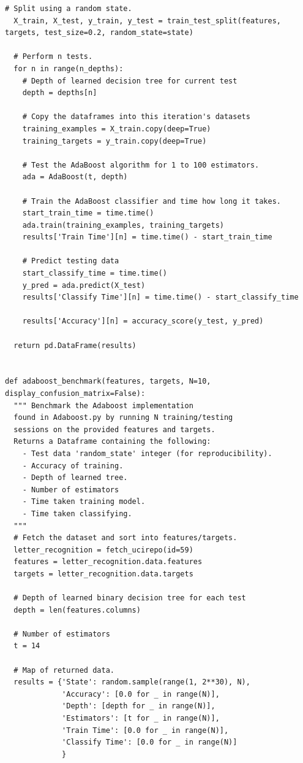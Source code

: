 \documentclass[a4paper]{article}
\begin{document}
\begin{lstlisting}[basicstyle= \scriptsize]
  # Split using a random state.
  X_train, X_test, y_train, y_test = train_test_split(features, targets, test_size=0.2, random_state=state)

  # Perform n tests.
  for n in range(n_depths):
    # Depth of learned decision tree for current test
    depth = depths[n]

    # Copy the dataframes into this iteration's datasets
    training_examples = X_train.copy(deep=True)
    training_targets = y_train.copy(deep=True)

    # Test the AdaBoost algorithm for 1 to 100 estimators.
    ada = AdaBoost(t, depth) 

    # Train the AdaBoost classifier and time how long it takes.
    start_train_time = time.time()
    ada.train(training_examples, training_targets)
    results['Train Time'][n] = time.time() - start_train_time 

    # Predict testing data
    start_classify_time = time.time()
    y_pred = ada.predict(X_test)
    results['Classify Time'][n] = time.time() - start_classify_time

    results['Accuracy'][n] = accuracy_score(y_test, y_pred)

  return pd.DataFrame(results)


def adaboost_benchmark(features, targets, N=10, display_confusion_matrix=False):
  """ Benchmark the Adaboost implementation
  found in Adaboost.py by running N training/testing
  sessions on the provided features and targets. 
  Returns a Dataframe containing the following:
    - Test data 'random_state' integer (for reproducibility).
    - Accuracy of training.
    - Depth of learned tree.
    - Number of estimators
    - Time taken training model.
    - Time taken classifying.
  """
  # Fetch the dataset and sort into features/targets.
  letter_recognition = fetch_ucirepo(id=59) 
  features = letter_recognition.data.features
  targets = letter_recognition.data.targets

  # Depth of learned binary decision tree for each test
  depth = len(features.columns) 

  # Number of estimators 
  t = 14 

  # Map of returned data.
  results = {'State': random.sample(range(1, 2**30), N),
             'Accuracy': [0.0 for _ in range(N)],
             'Depth': [depth for _ in range(N)],
             'Estimators': [t for _ in range(N)],
             'Train Time': [0.0 for _ in range(N)],
             'Classify Time': [0.0 for _ in range(N)]
             }
  

\end{lstlisting}
\end{document}
